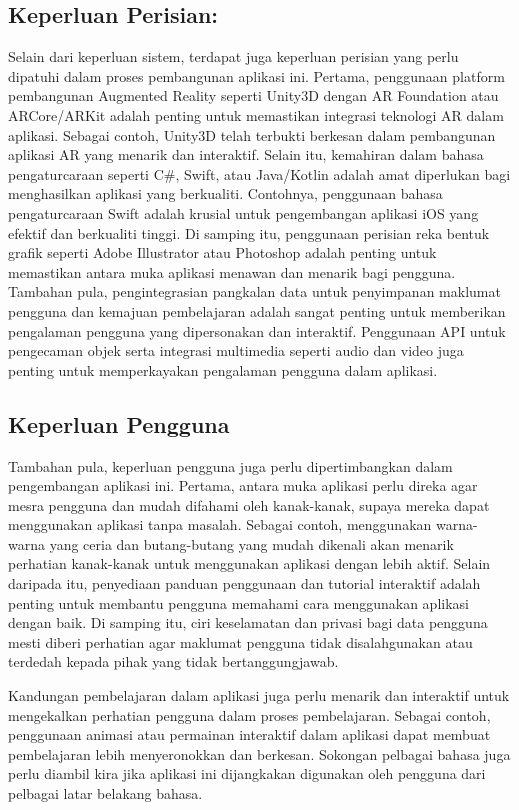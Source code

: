 \subsection{Keperluan Perisian:}
Selain dari keperluan sistem, terdapat juga keperluan perisian yang perlu dipatuhi dalam proses pembangunan aplikasi ini. Pertama, penggunaan platform pembangunan Augmented Reality seperti Unity3D dengan AR Foundation atau ARCore/ARKit adalah penting untuk memastikan integrasi teknologi AR dalam aplikasi. Sebagai contoh, Unity3D telah terbukti berkesan dalam pembangunan aplikasi AR yang menarik dan interaktif. Selain itu, kemahiran dalam bahasa pengaturcaraan seperti C\#, Swift, atau Java/Kotlin adalah amat diperlukan bagi menghasilkan aplikasi yang berkualiti. Contohnya, penggunaan bahasa pengaturcaraan Swift adalah krusial untuk pengembangan aplikasi iOS yang efektif dan berkualiti tinggi. Di samping itu, penggunaan perisian reka bentuk grafik seperti Adobe Illustrator atau Photoshop adalah penting untuk memastikan antara muka aplikasi menawan dan menarik bagi pengguna. Tambahan pula, pengintegrasian pangkalan data untuk penyimpanan maklumat pengguna dan kemajuan pembelajaran adalah sangat penting untuk memberikan pengalaman pengguna yang dipersonakan dan interaktif. Penggunaan API untuk pengecaman objek serta integrasi multimedia seperti audio dan video juga penting untuk memperkayakan pengalaman pengguna dalam aplikasi.
\subsection{Keperluan Pengguna}
Tambahan pula, keperluan pengguna juga perlu dipertimbangkan dalam pengembangan aplikasi ini. Pertama, antara muka aplikasi perlu direka agar mesra pengguna dan mudah difahami oleh kanak-kanak, supaya mereka dapat menggunakan aplikasi tanpa masalah. Sebagai contoh, menggunakan warna-warna yang ceria dan butang-butang yang mudah dikenali akan menarik perhatian kanak-kanak untuk menggunakan aplikasi dengan lebih aktif. Selain daripada itu, penyediaan panduan penggunaan dan tutorial interaktif adalah penting untuk membantu pengguna memahami cara menggunakan aplikasi dengan baik. Di samping itu, ciri keselamatan dan privasi bagi data pengguna mesti diberi perhatian agar maklumat pengguna tidak disalahgunakan atau terdedah kepada pihak yang tidak bertanggungjawab. 

\hspace{1cm} Kandungan pembelajaran dalam aplikasi juga perlu menarik dan interaktif untuk mengekalkan perhatian pengguna dalam proses pembelajaran. Sebagai contoh, penggunaan animasi atau permainan interaktif dalam aplikasi dapat membuat pembelajaran lebih menyeronokkan dan berkesan. Sokongan pelbagai bahasa juga perlu diambil kira jika aplikasi ini dijangkakan digunakan oleh pengguna dari pelbagai latar belakang bahasa.


